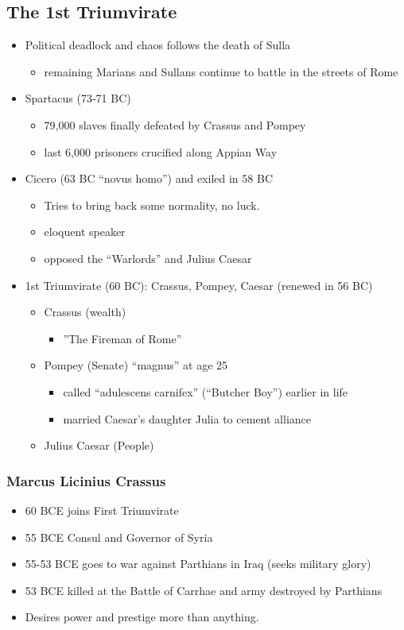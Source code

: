 \documentclass[12pt, twoside]{article}
\begin{document}
\subsection{The 1st Triumvirate}
\begin{itemize}
\item Political deadlock and chaos follows the death of Sulla
	\begin{itemize}
	\item remaining Marians and Sullans continue to battle in the streets of Rome
	\end{itemize}
\item Spartacus (73-71 BC)
	\begin{itemize}
	\item 79,000 slaves finally defeated by Crassus and Pompey
	\item last 6,000 prisoners crucified along Appian Way
	\end{itemize}
\item Cicero (63 BC “novus homo”) and exiled in 58 BC
	\begin{itemize}
	\item Tries to bring back some normality, no luck.
	\item eloquent speaker
	\item opposed the “Warlords” and Julius Caesar
	\end{itemize}
\item 1st Triumvirate (60 BC): Crassus, Pompey, Caesar (renewed in 56 BC)
	\begin{itemize}
	\item Crassus (wealth)
		\begin{itemize}
		\item ”The Fireman of Rome”	
		\end{itemize}
	\item Pompey (Senate) “magnus” at age 25
		\begin{itemize}
		\item called “adulescens carnifex” (“Butcher Boy”) earlier in life
		\item married Caesar’s daughter Julia to cement alliance
		\end{itemize}
	\item Julius Caesar (People)
	\end{itemize}
\end{itemize}

\subsubsection{Marcus Licinius Crassus}
\begin{itemize}
\item 60 BCE joins First Triumvirate 
\item 55 BCE Consul and Governor of Syria
\item 55-53 BCE goes to war against Parthians in Iraq (seeks military glory)
\item 53 BCE killed at the Battle of Carrhae and army destroyed by Parthians
\item Desires power and prestige more than anything.
\end{itemize}
	
\end{document}
